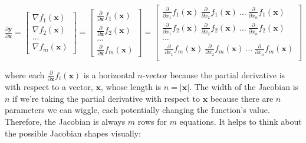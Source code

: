 \documentclass[11pt]{article}
\begin{document}
$
\frac{\partial \mathbf{y}}{\partial \mathbf{x}} = \begin{bmatrix}
\nabla f_1(\mathbf{x}) \\
\nabla f_2(\mathbf{x})\\
\ldots\\
\nabla f_m(\mathbf{x})
\end{bmatrix} = \begin{bmatrix}
\frac{\partial}{\partial \mathbf{x}} f_1(\mathbf{x}) \\
\frac{\partial}{\partial \mathbf{x}} f_2(\mathbf{x})\\
\ldots\\
\frac{\partial}{\partial \mathbf{x}} f_m(\mathbf{x})
\end{bmatrix} = \begin{bmatrix}
\frac{\partial}{\partial {x_1}} f_1(\mathbf{x})~ \frac{\partial}{\partial {x_2}} f_1(\mathbf{x}) ~\ldots~ \frac{\partial}{\partial {x_n}} f_1(\mathbf{x}) \\
\frac{\partial}{\partial {x_1}} f_2(\mathbf{x})~ \frac{\partial}{\partial {x_2}} f_2(\mathbf{x}) ~\ldots~ \frac{\partial}{\partial {x_n}} f_2(\mathbf{x}) \\
\ldots\\
~\frac{\partial}{\partial {x_1}} f_m(\mathbf{x})~ \frac{\partial}{\partial {x_2}} f_m(\mathbf{x}) ~\ldots~ \frac{\partial}{\partial {x_n}} f_m(\mathbf{x}) \\
\end{bmatrix}
$

where each $\frac{\partial}{\partial \mathbf{x}} f_i(\mathbf{x})$ is a horizontal $n$-vector because the partial derivative is with respect to a vector, $\mathbf{x}$, whose length is $n = |\mathbf{x}|$.  The width of the Jacobian is $n$ if we're taking the partial derivative with respect to $\mathbf{x}$ because there are $n$ parameters we can wiggle, each potentially changing the function's value. Therefore, the Jacobian is always $m$ rows for $m$ equations.  It helps to think about the possible Jacobian shapes visually:
\end{document}
